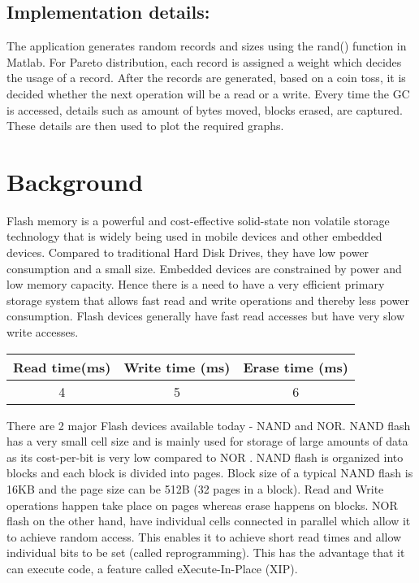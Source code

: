 \subsection{Implementation details:}
The application generates random records and sizes using the rand() function in Matlab. For Pareto distribution, each record is assigned a weight which decides the usage of a record. After the records are generated, based on a coin toss, it is decided whether the next operation will be a read or a write. Every time the GC is accessed, details such as amount of bytes moved, blocks erased, are captured. These details are then used to plot the required graphs. 

\section{Background}
	Flash memory is a powerful and cost-effective solid-state non volatile storage technology that is widely being used in mobile devices and other embedded devices. Compared to traditional Hard Disk Drives, they have low power consumption and a small size. Embedded devices are constrained by power and low memory capacity. Hence there is a need to have a very efficient primary storage system that allows fast read and write operations and thereby less power consumption. Flash devices generally have fast read accesses but have very slow write accesses. \\

\begin{center}
   \begin{tabular} {|  c | c | c | }
       \hline
	{\bf Read time(ms)} & {\bf Write time (ms)} & {\bf Erase time (ms)} \\ \hline
	4 & 5 & 6 \\ 
       \hline
   \end{tabular}
\end{center}

There are 2 major Flash devices available today - NAND and NOR. NAND flash has a very small cell size and is mainly used for storage of large amounts of data as its cost-per-bit is very low compared to NOR \cite{Toshiba}. NAND flash is organized into blocks and each block is divided into pages. Block size of a typical NAND flash is 16KB and the page size can be 512B (32 pages in a block). Read and Write operations happen take place on pages whereas erase happens on blocks. NOR flash on the other hand, have individual cells connected in parallel which allow it to achieve random access. This enables it to achieve short read times and allow individual bits to be set (called reprogramming). This has the advantage that it can execute code, a feature called eXecute-In-Place (XIP). \\

